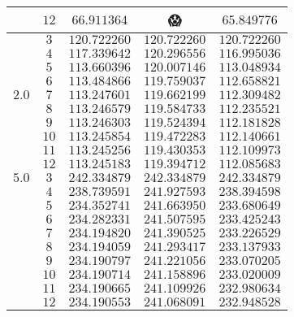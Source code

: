 \documentclass[
    a4paper, aps, twocolumn, floatfix, superscriptaddress,
    nofootinbib]{revtex4-1}
\newcommand{\nan}{\DejaSans 😱}
\newcommand{\1}{\mathds{1}}
\begin{document}
\begin{table}
\begin{ruledtabular}
\begin{tabular}{c|c|ccc}
                      & $12$ & $66.911364$ & \nan & $65.849776$ \\
                \hline
                      & $3$ & $120.722260$ & $120.722260$ & $120.722260$ \\
                      & $4$ & $117.339642$ & $120.296556$ & $116.995036$ \\
                      & $5$ & $113.660396$ & $120.007146$ & $113.048934$ \\
                      & $6$ & $113.484866$ & $119.759037$ & $112.658821$ \\
                $2.0$ & $7$ & $113.247601$ & $119.662199$ & $112.309482$ \\
                      & $8$ & $113.246579$ & $119.584733$ & $112.235521$ \\
                      & $9$ & $113.246303$ & $119.524394$ & $112.181828$ \\
                      & $10$ & $113.245854$ & $119.472283$ & $112.140661$ \\
                      & $11$ & $113.245256$ & $119.430353$ & $112.109973$ \\
                      & $12$ & $113.245183$ & $119.394712$ & $112.085683$ \\
                \hline
                $5.0$ & $3$ & $242.334879$ & $242.334879$ & $242.334879$ \\
                      & $4$ & $238.739591$ & $241.927593$ & $238.394598$ \\
                      & $5$ & $234.352741$ & $241.663950$ & $233.680649$ \\
                      & $6$ & $234.282331$ & $241.507595$ & $233.425243$ \\
                      & $7$ & $234.194820$ & $241.390525$ & $233.226529$ \\
                      & $8$ & $234.194059$ & $241.293417$ & $233.137933$ \\
                      & $9$ & $234.190797$ & $241.221056$ & $233.070205$ \\
                      & $10$ & $234.190714$ & $241.158896$ & $233.020009$ \\
                      & $11$ & $234.190665$ & $241.109926$ & $232.980634$ \\
                      & $12$ & $234.190553$ & $241.068091$ & $232.948528$
            \end{tabular}
        \end{ruledtabular}
        \label{tab:N12}
    \end{table}
\end{document}
